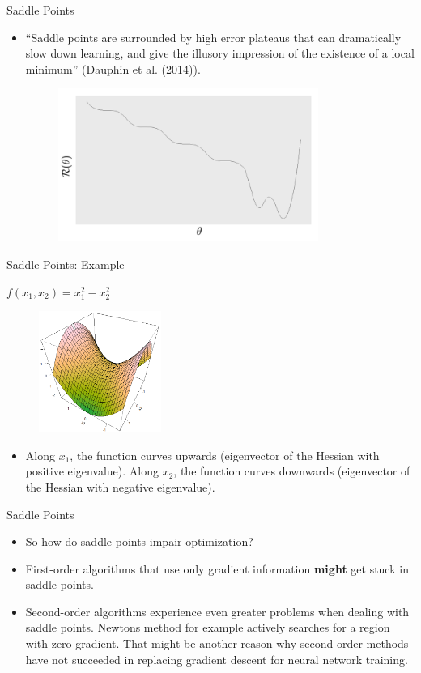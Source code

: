 \begin{vbframe}{Saddle Points}
\begin{itemize}
    \item \enquote{Saddle points are surrounded by high error plateaus that can dramatically slow down learning, and give the illusory impression of the existence of a local minimum} (Dauphin et al. (2014)).
  \begin{figure}
    \centering
    \includegraphics[width=8.5cm]{figure/cost.png}
  \end{figure}
  \end{itemize}
\end{vbframe}

\begin{vbframe}{Saddle Points: Example}
  \begin{center}
    $f(x_1, x_2) = x_1^2 - x_2^2$
  \end{center}
  \begin{figure}
    \centering
    \includegraphics[width=4cm]{figure/saddlepoint.png}
  \end{figure} 
  \begin{itemize}
    \item Along $x_1$, the function curves upwards (eigenvector of the Hessian with positive eigenvalue). Along $x_2$, the function curves downwards (eigenvector of the Hessian with negative eigenvalue).
  \end{itemize}
\end{vbframe}

\begin{vbframe}{Saddle Points}
  \begin{itemize}
    \item So how do saddle points impair optimization?
    \item First-order algorithms that use only gradient information \textbf{might} get stuck in saddle points.
    \item Second-order algorithms experience even greater problems when dealing with saddle points. Newtons method for example actively searches for a region with zero gradient. That might be another reason why second-order methods have not succeeded in replacing gradient descent for neural network training. 
  \end{itemize}
\end{vbframe}

